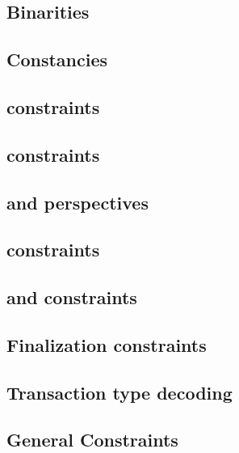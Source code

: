 \subsection{Binarities}                              \label{rlp txn v2: generalities: binarities}                     
\subsection{Constancies}                             \label{rlp txn v2: generalities: constancies}                    
\subsection{\userTransactionNumber{} constraints}    \label{rlp txn v2: generalities: user transaction number}        
\subsection{\locPhaseFlagSum{} constraints}          \label{rlp txn v2: generalities: phase flag sum}                 
\subsection{\locPerspFlagSum{} and perspectives}     \label{rlp txn v2: generalities: perspectives}                   
\subsection{\phaseEnd{} constraints}                 \label{rlp txn v2: generalities: PHASE_END constraints}          
\subsection{\ct{} and \maxCt{} constraints}          \label{rlp txn v2: generalities: ct and ct_max}                  
\subsection{Finalization constraints}                \label{rlp txn v2: generalities: heartbeat}                      
\subsection{Transaction type decoding}               \label{rlp txn v2: generalities: transaction row constraints}    
\subsection{General Constraints}                     \label{rlp txn v2: generalities: indices and limb constructed}   
